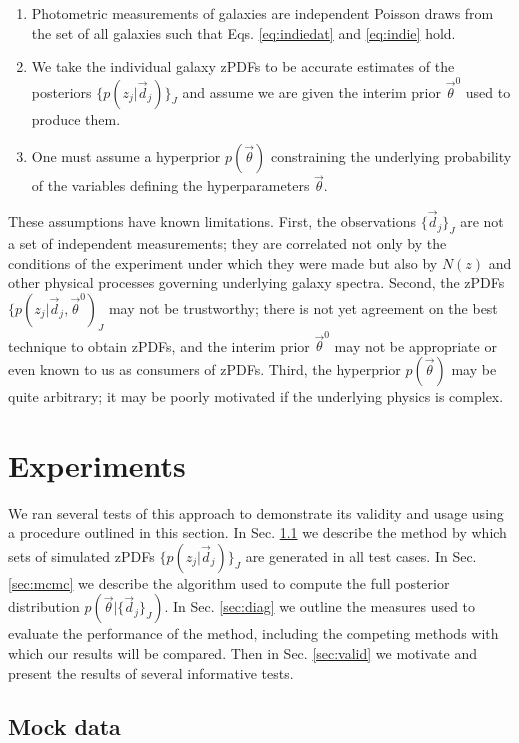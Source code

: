 \documentclass[preprint]{aastex}
\begin{document}
\begin{enumerate}
\item Photometric measurements of galaxies are independent Poisson draws from the set of all galaxies such that Eqs. \ref{eq:indiedat} and \ref{eq:indie} hold.
\item We take the individual galaxy zPDFs to be accurate estimates of the posteriors $\{p(z_{j}|\vec{d}_{j})\}_{J}$ and assume we are given the interim prior $\vec{\theta}^{0}$ used to produce them.
\item One must assume a hyperprior $p(\vec{\theta})$ constraining the underlying probability of the variables defining the hyperparameters $\vec{\theta}$.
\end{enumerate}

These assumptions have known limitations.  First, the observations $\{\vec{d}_{j}\}_{J}$ are not a set of independent measurements; they are correlated not only by the conditions of the experiment under which they were made but also by $N(z)$ and other physical processes governing underlying galaxy spectra.  Second, the zPDFs $\{p(z_{j}|\vec{d}_{j},\vec{\theta}^{0})_{J}$ may not be trustworthy; there is not yet agreement on the best technique to obtain zPDFs, and the interim prior $\vec{\theta}^{0}$ may not be appropriate or even known to us as consumers of zPDFs.  Third, the hyperprior $p(\vec{\theta})$ may be quite arbitrary; it may be poorly motivated if the underlying physics is complex.

\clearpage
\section{Experiments}
\label{sec:exp}

We ran several tests of this approach to demonstrate its validity and usage using a procedure outlined in this section.  In Sec. \ref{sec:mock} we describe the method by which sets of simulated zPDFs $\{p(z_{j}|\vec{d}_{j})\}_{J}$ are generated in all test cases.  In Sec. \ref{sec:mcmc} we describe the algorithm used to compute the full posterior distribution $p(\vec{\theta}|\{\vec{d}_{j}\}_{J})$.  In Sec. \ref{sec:diag} we outline the measures used to evaluate the performance of the method, including the competing methods with which our results will be compared.  Then in Sec. \ref{sec:valid} we motivate and present the results of several informative tests.

\clearpage
\subsection{Mock data}
\label{sec:mock}
\end{document}
